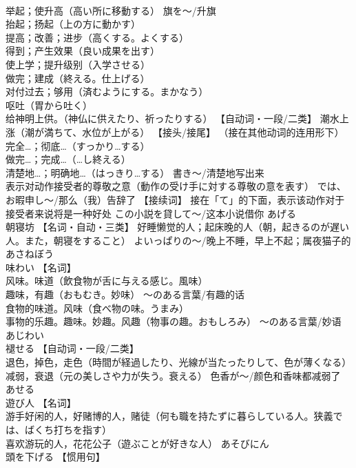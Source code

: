 \documentclass[8pt]{extreport}
\begin{document}
\begin{CJK}{UTF8}{min}
\\	举起；使升高（高い所に移動する） 旗を～/升旗 
\\	抬起；扬起（上の方に動かす） 
\\	提高；改善；进步（高くする。よくする） 
\\	得到；产生效果（良い成果を出す） 
\\	使上学；提升级别（入学させる） 
\\	做完；建成（終える。仕上げる） 
\\	对付过去；够用（済むようにする。まかなう） 
\\	呕吐（胃から吐く） 
\\	给神明上供。（神仏に供えたり、祈ったりする） 【自动词・一段/二类】 潮水上涨（潮が満ちて、水位が上がる） 【接头/接尾】 （接在其他动词的连用形下） 
\\	完全…；彻底…（すっかり…する） 
\\	做完…；完成…（…し終える） 
\\	清楚地…；明确地…（はっきり…する） 書き～/清楚地写出来 
\\	表示对动作接受者的尊敬之意（動作の受け手に対する尊敬の意を表す） では、お暇申し～/那么（我）告辞了 【接续词】 接在「て」的下面，表示该动作对于接受者来说将是一种好处 この小説を貸して～/这本小说借你	あげる	
\\	朝寝坊	【名词・自动・三类】 好睡懒觉的人；起床晚的人（朝，起きるのが遅い人。また，朝寝をすること） よいっぱりの～/晚上不睡，早上不起；属夜猫子的	あさねぼう	
\\	味わい	【名词】 
\\	风味。味道（飲食物が舌に与える感じ。風味） 
\\	趣味，有趣（おもむき。妙味） ～のある言葉/有趣的话 
\\	食物的味道。风味（食べ物の味。うまみ） 
\\	事物的乐趣。趣味。妙趣。风趣（物事の趣。おもしろみ） ～のある言葉/妙语	あじわい	
\\	褪せる	【自动词・一段/二类】 
\\	退色，掉色，走色（時間が経過したり、光線が当たったりして、色が薄くなる） 
\\	减弱，衰退（元の美しさや力が失う。衰える） 色香が～/颜色和香味都减弱了	あせる	
\\	遊び人	【名词】 
\\	游手好闲的人，好赌博的人，赌徒（何も職を持たずに暮らしている人。狭義では、ばくち打ちを指す） 
\\	喜欢游玩的人，花花公子（遊ぶことが好きな人）	あそびにん	
\\	頭を下げる	【惯用句】 

\end{CJK}
\end{document}
